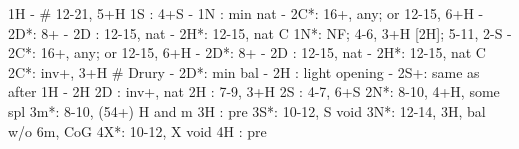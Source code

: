 1H -  # 12-21, 5+H
1S : 4+S
   - 1N : min nat
   - 2C*: 16+, any; or 12-15, 6+H
        - 2D*: 8+
   - 2D : 12-15, nat
   - 2H*: 12-15, nat C
1N*: NF; 4-6, 3+H [2H]; 5-11, 2-S
   - 2C*: 16+, any; or 12-15, 6+H
        - 2D*: 8+
   - 2D : 12-15, nat
   - 2H*: 12-15, nat C
2C*: inv+, 3+H  # Drury
   - 2D*: min bal
   - 2H : light opening
   - 2S+: same as after 1H - 2H
2D : inv+, nat
2H : 7-9, 3+H
2S : 4-7, 6+S
2N*: 8-10, 4+H, some spl
3m*: 8-10, (54+) H and m
3H : pre
3S*: 10-12, S void
3N*: 12-14, 3H, bal w/o 6m, CoG
4X*: 10-12, X void
4H : pre